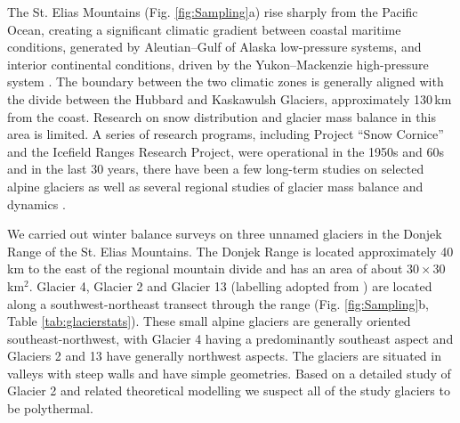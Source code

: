 \documentclass{sfuthesis}
\begin{document}
The St. Elias Mountains (Fig. \ref{fig:Sampling}a) rise sharply from the Pacific Ocean, creating a significant climatic gradient between coastal maritime conditions, generated by Aleutian--Gulf of Alaska low-pressure systems, and interior continental conditions, driven by the Yukon--Mackenzie high-pressure system \citep{Taylor1969}. The boundary between the two climatic zones is generally aligned with the divide between the Hubbard and Kaskawulsh Glaciers, approximately 130\,km from the coast. Research on snow distribution and glacier mass balance in this area is limited. A series of research programs, including Project ``Snow Cornice''  and the Icefield Ranges Research Project, were operational in the 1950s and 60s \citep{Wood1948, Danby2003} and in the last 30 years, there have been a few long-term studies on selected alpine glaciers \citep[e.g.][]{Clarke2014} as well as several regional studies of glacier mass balance and dynamics \citep[e.g.][]{Arendt2008, Burgess2013,Waechter2015}.

We carried out winter balance surveys on three unnamed glaciers in the Donjek Range of the St. Elias Mountains. The Donjek Range is located approximately 40 km to the east of the regional mountain divide and has an area of about $30\times30$\,km$^2$. Glacier 4, Glacier 2 and Glacier 13 (labelling adopted from \cite{Crompton2016}) are located along a southwest-northeast transect through the range (Fig. \ref{fig:Sampling}b, Table \ref{tab:glacierstats}). These small alpine glaciers are generally oriented southeast-northwest, with Glacier 4 having a predominantly southeast aspect and Glaciers 2 and 13 have generally northwest aspects. The glaciers are situated in valleys with steep walls and have simple geometries. Based on a detailed study of Glacier 2  \citep{Wilson2013} and related theoretical modelling \citep{Wilson2013a} we suspect all of the study glaciers to be polythermal. 
\end{document}
